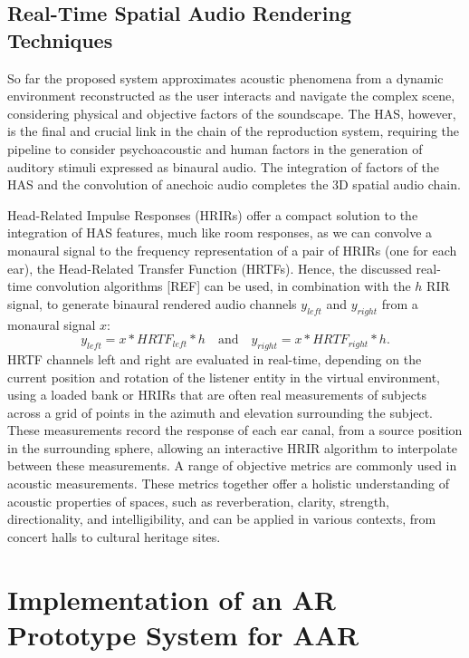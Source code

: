 \subsection{Real-Time Spatial Audio Rendering Techniques}

So far the proposed system approximates acoustic phenomena from a dynamic environment reconstructed as the user interacts and navigate the complex scene, considering physical and objective factors of the soundscape. The HAS, however, is the final and crucial link in the chain of the reproduction system, requiring the pipeline to consider psychoacoustic and human factors in the generation of auditory stimuli expressed as binaural audio. The integration of factors of the HAS and the convolution of anechoic audio completes the 3D spatial audio chain.\par
Head-Related Impulse Responses (HRIRs) offer a compact solution to the integration of HAS features, much like room responses, as we can convolve a monaural signal to the frequency representation of a pair of HRIRs (one for each ear), the Head-Related Transfer Function (HRTFs). Hence, the discussed real-time convolution algorithms [REF] can be used, in combination with the $h$ RIR signal, to generate binaural rendered audio channels $y_{left}$ and $y_{right}$ from a monaural signal $x$:
\begin{equation}
    y_{left} = x * HRTF_{left} * h \quad \textrm{and} \quad  y_{right} = x * HRTF_{right} * h \textrm{.}
\end{equation}
HRTF channels left and right are evaluated in real-time, depending on the current position and rotation of the listener entity in the virtual environment, using a loaded bank or HRIRs that are often real measurements of subjects across a grid of points in the azimuth and elevation surrounding the subject. These measurements record the response of each ear canal, from a source position in the surrounding sphere, allowing an interactive HRIR algorithm to interpolate between these measurements. A range of objective metrics are commonly used in acoustic measurements. These metrics together offer a holistic understanding of acoustic properties of spaces, such as reverberation, clarity, strength, directionality, and intelligibility, and can be applied in various contexts, from concert halls to cultural heritage sites. 


\section{Implementation of an AR Prototype System for AAR}

